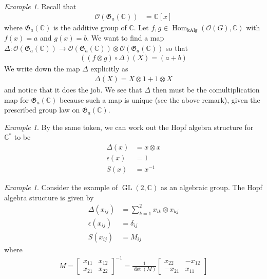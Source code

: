 \documentclass{amsart}
\newcommand{\cO}{{\mathcal{O}}}
\DeclareMathOperator{\Hom}{Hom}
\DeclareMathOperator{\kAlg}{kAlg}
\DeclareMathOperator{\GL}{GL}
\newcommand{\C}{\mathbb{C}}
\newcommand{\Ga}{\mf G_a}
\newcommand{\mf}[1]{\mathfrak{#1}}
\newcommand{\inv}[1]{{#1}^{-1}}
\numberwithin{equation}{section}
\theoremstyle{plain} %
\theoremstyle{definition}
\theoremstyle{remark}
\newtheorem{example}[equation]{Example}
\begin{document}
\begin{example}
	Recall that
	\begin{align*}
		\cO(\Ga(\C)) & = \C[x]
	\end{align*} where $\Ga(\C)$ is the additive group of $\C$.
	Let $f,g\in \Hom_{\kAlg}(\cO(G),\C)$ with $f(x) = a$ and $g(x) = b$.
	We want to find a map $\Delta: \cO(\Ga(\C))\to \cO(\Ga(\C))\otimes \cO(\Ga(\C))$ so that
	\begin{align*}
		((f\otimes g)\circ \Delta)(X) = (a+b)
	\end{align*}
	We write down the map $\Delta$ explicitly as
	\begin{align*}
		\Delta(X) = X\otimes 1 + 1\otimes X
	\end{align*} and notice that it does the job. We see that $\Delta$ then must be the
	comultiplication map for $\Ga(\C)$ because such a map is unique (see the above remark), given the prescribed group law on $\Ga(\C)$.
\end{example}

\begin{example}
	By the same token, we can work out the Hopf algebra structure for $\C^*$ to be
	\begin{align*}
		\Delta(x)   & = x\otimes x \\
		\epsilon(x) & = 1          \\
		S(x)        & = \inv{x}
	\end{align*}
\end{example}

\begin{example}
	Consider the example of $\GL(2,\C)$ as an algebraic group. The Hopf algebra structure is given by
	\begin{align*}
		\Delta(x_{ij})   & = \sum_{k=1}^2 x_{ik}\otimes x_{kj} \\
		\epsilon(x_{ij}) & = \delta_{ij}                       \\
		S(x_{ij})        & = M_{ij}
	\end{align*} where \begin{align*}
		M = \begin{bmatrix}
			    x_{11} & x_{12} \\
			    x_{21} & x_{22}
		    \end{bmatrix}^{-1} = \frac{1}{\det(M)}\begin{bmatrix}
			                                          x_{22}  & -x_{12} \\
			                                          -x_{21} & x_{11}
		                                          \end{bmatrix}
	\end{align*}
\end{example}
\end{document}
